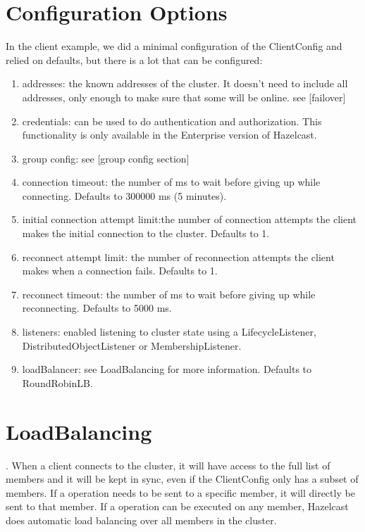 \section{Configuration Options}
In the client example, we did a minimal configuration of the ClientConfig and relied on defaults, but there is a lot that can be configured:
\begin{enumerate}
\item addresses: the known addresses of the cluster. It doesn't need to include all addresses, only enough to make sure that some will be online. see [failover]
\item credentials: can be used to do authentication and authorization. This functionality is only available in the Enterprise version of Hazelcast.
\item group config: see [group config section]
\item connection timeout: the number of ms to wait before giving up while connecting. Defaults to 300000 ms (5 minutes).
\item initial connection attempt limit:the  number of connection attempts the client makes the initial connection to the cluster. Defaults to 1.
\item reconnect attempt limit: the number of reconnection attempts the client makes when a connection fails. Defaults to 1.
\item reconnect timeout: the number of ms to wait before giving up while reconnecting. Defaults to 5000 ms.
\item listeners: enabled listening to cluster state using a LifecycleListener, DistributedObjectListener or MembershipListener.
\item loadBalancer: see LoadBalancing for more information. Defaults to RoundRobinLB.
\end{enumerate}

\section{LoadBalancing}.
When a client connects to the cluster, it will have access to the full list of members and it will be kept in sync, even if the ClientConfig only has a subset of members. If a operation needs to be sent to a specific member, it will directly be sent to that member. If a operation can be executed on any member, Hazelcast does automatic load balancing over all members in the cluster. 

